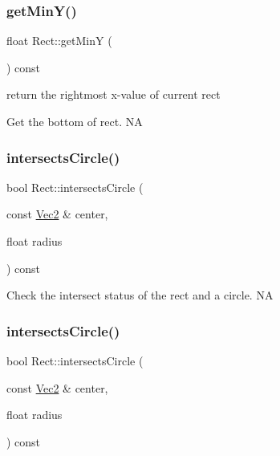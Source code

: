 \subsubsection{\texorpdfstring{get\+Min\+Y()}{getMinY()}\hspace{0.1cm}{\footnotesize\ttfamily [2/2]}}
{\footnotesize\ttfamily float Rect\+::get\+MinY (\begin{DoxyParamCaption}{ }\end{DoxyParamCaption}) const}



return the rightmost x-\/value of current rect 

Get the bottom of rect.  NA \mbox{\label{classRect_a14ae2011ca780e304387920a8ebb1538}} 
\subsubsection{\texorpdfstring{intersects\+Circle()}{intersectsCircle()}\hspace{0.1cm}{\footnotesize\ttfamily [1/2]}}
{\footnotesize\ttfamily bool Rect\+::intersects\+Circle (\begin{DoxyParamCaption}\item[{const \hyperlink{classVec2}{Vec2} \&}]{center,  }\item[{float}]{radius }\end{DoxyParamCaption}) const}

Check the intersect status of the rect and a circle.  NA \mbox{\label{classRect_a14ae2011ca780e304387920a8ebb1538}} 
\subsubsection{\texorpdfstring{intersects\+Circle()}{intersectsCircle()}\hspace{0.1cm}{\footnotesize\ttfamily [2/2]}}
{\footnotesize\ttfamily bool Rect\+::intersects\+Circle (\begin{DoxyParamCaption}\item[{const \hyperlink{classVec2}{Vec2} \&}]{center,  }\item[{float}]{radius }\end{DoxyParamCaption}) const}

